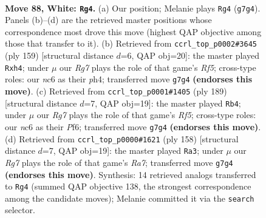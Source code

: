 \documentclass[11pt]{article}
\begin{document}
\clearpage

\begin{figure}[p]\centering
\begin{subfigure}{0.46\textwidth}\centering
\resizebox{\linewidth}{!}{%
\newchessgame
\chessboard[
  setfen={8/6R1/P1n2k2/8/8/7r/5K2/8 w - - 3 88},
  showmover=false,
  pgfstyle=straightmove, color=movearrow, markmove={g7-g4}
]}
\caption{}
\end{subfigure}\hfill
\begin{subfigure}{0.46\textwidth}\centering
\resizebox{\linewidth}{!}{%
\newchessgame
\chessboard[
  setfen={R7/7k/8/4K2p/5r1P/8/8/8 b - - 4 80},
  showmover=false,
  pgfstyle=straightmove, color=movearrow, markmove={f4-h4}
]}
\caption{}
\end{subfigure}
\\[4pt]
\begin{subfigure}{0.46\textwidth}\centering
\resizebox{\linewidth}{!}{%
\newchessgame
\chessboard[
  setfen={8/R7/5p1k/5P2/5r2/6K1/8/8 b - - 3 95},
  showmover=false,
  pgfstyle=straightmove, color=movearrow, markmove={f4-b4}
]}
\caption{}
\end{subfigure}\hfill
\begin{subfigure}{0.46\textwidth}\centering
\resizebox{\linewidth}{!}{%
\newchessgame
\chessboard[
  setfen={8/R7/1k6/8/8/5K2/8/2r5 w - - 20 80},
  showmover=false,
  pgfstyle=straightmove, color=movearrow, markmove={a7-a3}
]}
\caption{}
\end{subfigure}
\caption{\textbf{Move 88, White: \texttt{Rg4}.} (a) Our position; Melanie plays \texttt{Rg4} (\texttt{g7g4}). Panels (b)--(d) are the retrieved master positions whose correspondence most drove this move (highest QAP objective among those that transfer to it). (b) Retrieved from \texttt{ccrl\_top\_p0002\#3645} (ply 159) [structural distance $d$=6, QAP obj=20]: the master played \texttt{Rxh4}; under $\mu$ our \emph{Rg7} plays the role of that game's \emph{Rf5}; cross-type roles: our \emph{n}c6 as their \emph{p}h4; transferred move \texttt{g7g4} \textbf{(endorses this move)}. (c) Retrieved from \texttt{ccrl\_top\_p0001\#1405} (ply 189) [structural distance $d$=7, QAP obj=19]: the master played \texttt{Rb4}; under $\mu$ our \emph{Rg7} plays the role of that game's \emph{Rf5}; cross-type roles: our \emph{n}c6 as their \emph{P}f6; transferred move \texttt{g7g4} \textbf{(endorses this move)}. (d) Retrieved from \texttt{ccrl\_top\_p0000\#1621} (ply 158) [structural distance $d$=7, QAP obj=19]: the master played \texttt{Ra3}; under $\mu$ our \emph{Rg7} plays the role of that game's \emph{Ra7}; transferred move \texttt{g7g4} \textbf{(endorses this move)}. Synthesis: 14 retrieved analogs transferred to \texttt{Rg4} (summed QAP objective 138, the strongest correspondence among the candidate moves); Melanie committed it via the \texttt{search} selector.}
\label{fig:thought-m174}
\end{figure}
\end{document}

